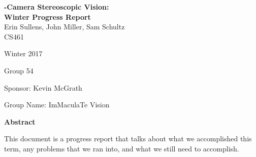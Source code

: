 \documentclass[10pt,draftclsnofoot,onecolumn]{IEEEtran}
\title{}
\author{ }
\date{October 2016}
\makeatletter
\renewcommand{\maketitle}{\bgroup\setlength{\parindent}{0pt}
\begin{flushleft}
\Huge
  \textbf{\@Multi-Camera Stereoscopic Vision: \\Winter Progress Report}
\large
\vspace{3mm}\\
  Erin Sullens, John Miller, Sam Schultz \\
   \vspace{3mm}
  CS461

Winter 2017

Group 54

Sponsor: Kevin McGrath

Group Name: ImMaculaTe Vision
  
\end{flushleft}\egroup
}
\makeatother
\begin{document}
\singlespacing
\maketitle
\begin{center}



\vspace{2in}
{\Medium\textbf{Abstract}}
\end{center}
\setlength{\parindent}{0cm}

This document is a progress report that talks about what we accomplished this term, any problems that we ran into, and what we still need to accomplish.  \\
\end{document}
